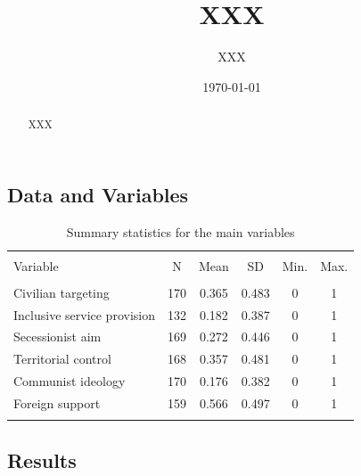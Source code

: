\documentclass[12pt, letterpaper]{article}
\title{\large \textbf{XXX}}
\author{XXX}
\date{\today}
\begin{document}
	
	\maketitle
	\thispagestyle{empty}
	\vspace{4cm}
	
	\begin{abstract}
		\vspace{0.25cm}\noindent XXX
	\end{abstract}
	
	\pagebreak
	
\setlength{\parindent}{1cm}
\parskip=0pt
\setcounter{page}{1}

\subsection*{Data and Variables}

\begin{table}[htbp] \centering 
	\caption{Summary statistics for the main variables} 
	\label{t1} 
	\begin{tabular}{@{\extracolsep{5pt}}lccccc} 
		\\[-1.8ex]\hline 
		\hline \\[-1.8ex] 
		Variable & \multicolumn{1}{c}{N} & \multicolumn{1}{c}{Mean} & \multicolumn{1}{c}{SD} & \multicolumn{1}{c}{Min.} & \multicolumn{1}{c}{Max.} \\ 
		\hline \\[-1.8ex] 
		Civilian targeting & 170 & 0.365 & 0.483 & 0 & 1 \\ 
		Inclusive service provision & 132 & 0.182 & 0.387 & 0 & 1 \\ 
		Secessionist aim & 169 & 0.272 & 0.446 & 0 & 1 \\ 
		Territorial control & 168 & 0.357 & 0.481 & 0 & 1 \\ 
		Communist ideology & 170 & 0.176 & 0.382 & 0 & 1 \\ 
		Foreign support & 159 & 0.566 & 0.497 & 0 & 1 \\ 
		\hline \\[-1.8ex] 
	\end{tabular} 
\end{table} 

\subsection*{Results}
\end{document}
